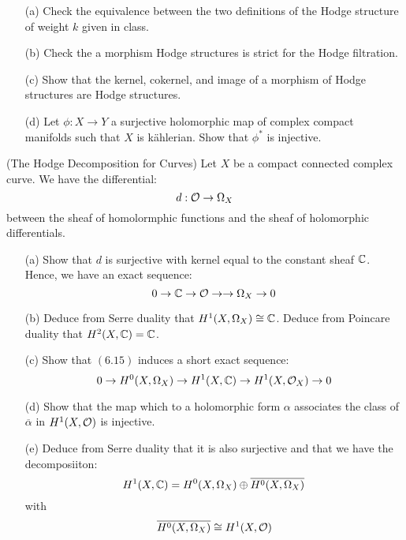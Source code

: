 \documentclass[12pt]{article}
\begin{document}


\begin{problem}{1}
    \bbni
    \begin{enumerate}
        \item[(a)] Check the equivalence between the two definitions of the Hodge structure of weight $k$ given in class. 
        \item[(b)] Check the a morphism Hodge structures is strict for the Hodge filtration. 
        \item[(c)] Show that the kernel, cokernel, and image of a morphism of Hodge structures are Hodge structures.
        \item[(d)] Let $\phi: X \to Y$ a surjective holomorphic map of complex compact manifolds such that $X$ is k\"ahlerian. Show that $\phi^*$ is injective.
    \end{enumerate}
\end{problem}
\newpage





\begin{problem}{3}(The Hodge Decomposition for Curves)
    Let $X$ be a compact connected complex curve. We have the differential:
    \[d: \mathcal{O} \to \Omega_X\]
    between the sheaf of homolormphic functions and the sheaf of holomorphic differentials.
    \begin{enumerate}
        \item[(a)] Show that $d$ is surjective with kernel equal to the constant sheaf $\mathbb C$. Hence, we have an exact sequence: 
        \[ 0 \to \mathbb C \to \mathcal{O} \rightarrow \to \Omega_X \to 0\]
        \item[(b)] Deduce from Serre duality that $H^1(X, \Omega_X) \cong \mathbb C$. Deduce from Poincare duality that $H^2(X, \mathbb C) = \mathbb C$. 
        \item[(c)] Show that $(6.15)$ induces a short exact sequence: 
        \[ 0 \to H^0(X, \Omega_X) \to H^1(X, \mathbb C) \to H^1(X, \mathcal{O}_X) \to 0\]
        \item[(d)] Show that the map which to a holomorphic form $\alpha$ associates the class of $\overline{\alpha}$ in $H^1(X, \mathcal{O})$ is injective.
        \item[(e)] Deduce from Serre duality that it is also surjective and that we have the decomposiiton: 
        \[ H^1(X, \mathbb C) = H^0(X, \Omega_X) \oplus \overline{H^0(X, \Omega_X)}\]
        with 
        \[ \overline{H^0(X, \Omega_X)} \cong H^1(X, \mathcal{O})\]
    \end{enumerate}

\end{problem}
\begin{solution}
\end{solution}
\newpage

\begin{problem}{4}

\end{problem}
\begin{solution}
\end{solution}
\newpage
\end{document}
